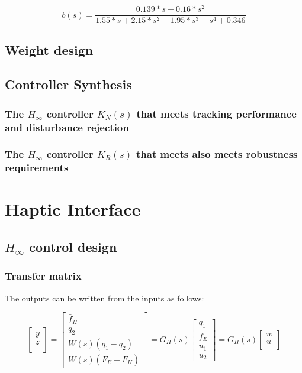 \documentclass{article}
\begin{document}
\begin{equation}
    b(s) = \frac{0.139*s + 0.16*s^2}{1.55*s + 2.15*s^2 + 1.95*s^3 + s^4 + 0.346}
\end{equation}

\subsection{Weight design}

\subsection{Controller Synthesis}

\subsubsection{The $H_\infty$ controller $K_N(s)$ that meets tracking performance and disturbance rejection}

\subsubsection{The $H_\infty$ controller $K_R(s)$ that meets also meets robustness requirements}

\section{Haptic Interface}

\subsection{ $H_\infty$ control design}

\subsubsection{Transfer matrix}

The outputs can be written from the inputs as follows:

\begin{equation}
    \begin{bmatrix}
        y \\
        z \\
    \end{bmatrix} = \begin{bmatrix}
        \bar{f}_H \\
        q_2 \\
        W(s)(q_1 - q_2) \\
        W(s)(\bar{F}_E - \bar{F}_H)
    \end{bmatrix} = G_H(s) \begin{bmatrix}
        q_1 \\
        \bar{f}_E \\
        u_1 \\
        u_2
    \end{bmatrix} = G_H(s) \begin{bmatrix}
        w \\
        u \\
    \end{bmatrix}
\end{equation}
\end{document}
